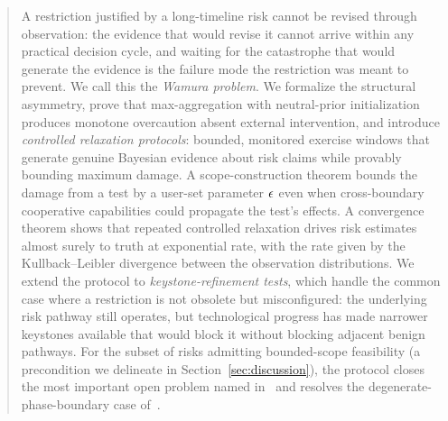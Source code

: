 \begin{abstract}
A restriction justified by a long-timeline risk cannot be revised
through observation: the evidence that would revise it cannot
arrive within any practical decision cycle, and waiting for the
catastrophe that would generate the evidence is the failure mode
the restriction was meant to prevent.  We call this the
\emph{Wamura problem}.  We formalize the structural asymmetry,
prove that max-aggregation with neutral-prior initialization
produces monotone overcaution absent external intervention, and
introduce \emph{controlled relaxation protocols}: bounded,
monitored exercise windows that generate genuine Bayesian evidence
about risk claims while provably bounding maximum damage.  A
scope-construction theorem bounds the damage from a test by a
user-set parameter $\damagebound$ even when cross-boundary
cooperative capabilities could propagate the test's effects.  A
convergence theorem shows that repeated controlled relaxation
drives risk estimates almost surely to truth at exponential rate,
with the rate given by the Kullback--Leibler divergence between
the observation distributions.  We extend the protocol to
\emph{keystone-refinement tests}, which handle the common case
where a restriction is not obsolete but misconfigured: the
underlying risk pathway still operates, but technological
progress has made narrower keystones available that would block
it without blocking adjacent benign pathways.  For the subset of risks admitting
bounded-scope feasibility (a precondition we delineate in
Section~\ref{sec:discussion}), the protocol closes the most
important open problem named
in~\citep{lasser2026horizon} and resolves the
degenerate-phase-boundary case
of~\citep[Proposition~4]{lasser2026phase}.
\end{abstract}
